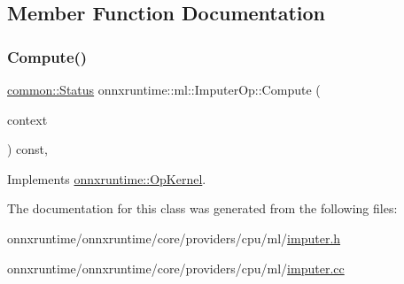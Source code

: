 \subsection{Member Function Documentation}
\mbox{\label{classonnxruntime_1_1ml_1_1ImputerOp_a0113237b5a386fd9f32513d55005a8fb}} 
\subsubsection{\texorpdfstring{Compute()}{Compute()}}
{\footnotesize\ttfamily \mbox{\hyperlink{classonnxruntime_1_1common_1_1Status}{common\+::\+Status}} onnxruntime\+::ml\+::\+Imputer\+Op\+::\+Compute (\begin{DoxyParamCaption}\item[{\mbox{\hyperlink{classonnxruntime_1_1OpKernelContext}{Op\+Kernel\+Context}} $\ast$}]{context }\end{DoxyParamCaption}) const\hspace{0.3cm}{\ttfamily [override]}, {\ttfamily [virtual]}}



Implements \mbox{\hyperlink{classonnxruntime_1_1OpKernel_a9eca8656a78b1b3ab9d3351a12798650}{onnxruntime\+::\+Op\+Kernel}}.



The documentation for this class was generated from the following files\+:\begin{DoxyCompactItemize}
\item 
onnxruntime/onnxruntime/core/providers/cpu/ml/\mbox{\hyperlink{imputer_8h}{imputer.\+h}}\item 
onnxruntime/onnxruntime/core/providers/cpu/ml/\mbox{\hyperlink{imputer_8cc}{imputer.\+cc}}\end{DoxyCompactItemize}
